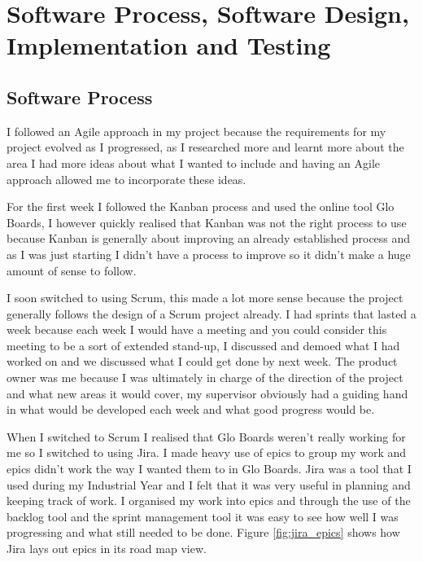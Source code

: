 \chapter{Software Process, Software Design, Implementation and Testing}

\section{Software Process}

I followed an Agile approach in my project because the requirements for my project evolved as I progressed, as I researched more and learnt more about the area I had more ideas about what I wanted to include and having an Agile approach allowed me to incorporate these ideas. 

For the first week I followed the Kanban process and used the online tool Glo Boards\cite{glo_board}, I however quickly realised that Kanban was not the right process to use because Kanban is generally about improving an already established process and as I was just starting I didn't have a process to improve so it didn't make a huge amount of sense to follow. 

I soon switched to using Scrum, this made a lot more sense because the project generally follows the design of a Scrum project already. I had sprints that lasted a week because each week I would have a meeting and you could consider this meeting to be a sort of extended stand-up, I discussed and demoed what I had worked on and we discussed what I could get done by next week. The product owner was me because I was ultimately in charge of the direction of the project and what new areas it would cover, my supervisor obviously had a guiding hand in what would be developed each week and what good progress would be.

When I switched to Scrum I realised that Glo Boards weren't really working for me so I switched to using Jira\cite{jira_site}. I made heavy use of epics to group my work and epics didn't work the way I wanted them to in Glo Boards. Jira was a tool that I used during my Industrial Year and I felt that it was very useful in planning and keeping track of work. I organised my work into epics and through the use of the backlog tool and the sprint management tool it was easy to see how well I was progressing and what still needed to be done. Figure \ref{fig:jira_epics} shows how Jira lays out epics in its road map view.

